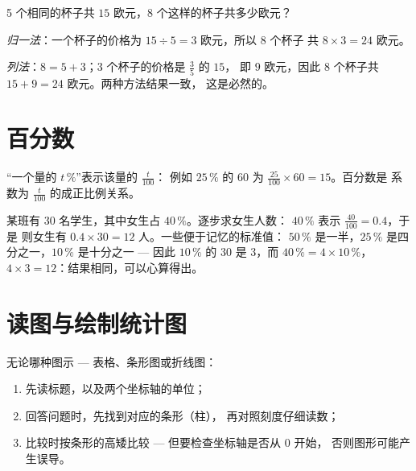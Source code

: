 \begin{example}\label{ex:g6:propdata:methods}
5 个相同的杯子共 $15$ 欧元，8 个这样的杯子共多少欧元？

\emph{归一法}：一个杯子的价格为 $15 \div 5 = 3$ 欧元，所以 8 个杯子
共 $8 \times 3 = 24$ 欧元。

\emph{列法}：$8 = 5 + 3$；3 个杯子的价格是 $\frac{3}{5}$ 的 $15$，
即 $9$ 欧元，因此 8 个杯子共 $15 + 9 = 24$ 欧元。两种方法结果一致，
这是必然的。
\end{example}

\section{百分数}

\begin{definition}[百分数]\label{def:g6:propdata:percent}
“一个量的 $t\,\%$”表示该量的 $\frac{t}{100}$：
例如 $25\,\%$ 的 $60$ 为 $\frac{25}{100} \times 60 = 15$。百分数是
系数为 $\frac{t}{100}$ 的成正比例关系。
\end{definition}

\begin{example}\label{ex:g6:propdata:percent}
某班有 $30$ 名学生，其中女生占 $40\,\%$。逐步求女生人数：
$40\,\%$ 表示 $\frac{40}{100} = 0.4$，于是
则女生有 $0.4 \times 30 = 12$ 人。一些便于记忆的标准值：
$50\,\%$ 是一半，$25\,\%$ 是四分之一，$10\,\%$ 是十分之一 ---
因此 $10\,\%$ 的 $30$ 是 $3$，而 $40\,\% = 4 \times 10\,\%$，
$4 \times 3 = 12$：结果相同，可以心算得出。
\end{example}

\section{读图与绘制统计图}

\begin{method}[读表或读图]\label{met:g6:propdata:read}
无论哪种图示 --- 表格、条形图或折线图：
\begin{enumerate}
  \item 先读标题，以及两个坐标轴的单位；
  \item 回答问题时，先找到对应的条形（柱），
        再对照刻度仔细读数；
  \item 比较时按条形的高矮比较 --- 但要检查坐标轴是否从 $0$ 开始，
        否则图形可能产生误导。
\end{enumerate}
\end{method}

